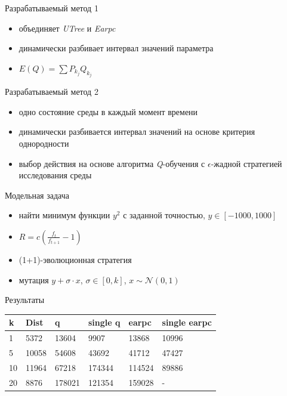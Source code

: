 \documentclass[hyperref=unicode,graphics=pdflatex,13pt]{beamer}
\begin{document}
\begin{frame}{Разрабатываемый метод 1}
    \begin{itemize}
        \item объединяет \textit{UTree} и \textit{Earpc}
        \item динамически разбивает интервал значений параметра
        \item $E(Q) = \sum{P_{k_j}Q_{k_j}}$
    \end{itemize}
\end{frame}

\begin{frame}{Разрабатываемый метод 2}
  \begin{itemize}
   \item одно состояние среды в каждый момент времени
   \item динамически разбивается интервал значений на основе критерия однородности
   \item выбор действия на основе алгоритма \textit{Q}-обучения с $\epsilon$-жадной стратегией исследования среды
  \end{itemize}
\end{frame}

\begin{frame}{Модельная задача}
    \begin{itemize}
        \item найти минимум функции $y^2$ с заданной точностью, $y \in [-1000, 1000]$
        \item $R = c(\frac{f_t}{f_{t + 1}} - 1)$
        \item (1+1)-эволюционная стратегия
        \item мутация $y + \sigma \cdot x$, $\sigma \in [0, k]$, $x \sim \mathcal{N}(0,1)$
    \end{itemize}
\end{frame}

\begin{frame}{Результаты}
    \begin{tabular}{|l|l|l|l|l|l|}
        \hline
        k & Dist & q & single q & earpc & single earpc\\
        \hline
        1 & \cellcolor{olivegreen}5372 & 13604 & 9907 & 13868 & 10996 \\
        \hline
        5 & \cellcolor{olivegreen}10058 & 54608 & 43692 & 41712 & 47427 \\
        \hline
        10 & \cellcolor{olivegreen}11964 & 67218 & 174344 & 114524 & 89886 \\
        \hline
        20 & \cellcolor{olivegreen}8876 & 178021 & 121354 & 159028 & - \\
        \hline
    \end{tabular}
\end{frame}
\end{document}
